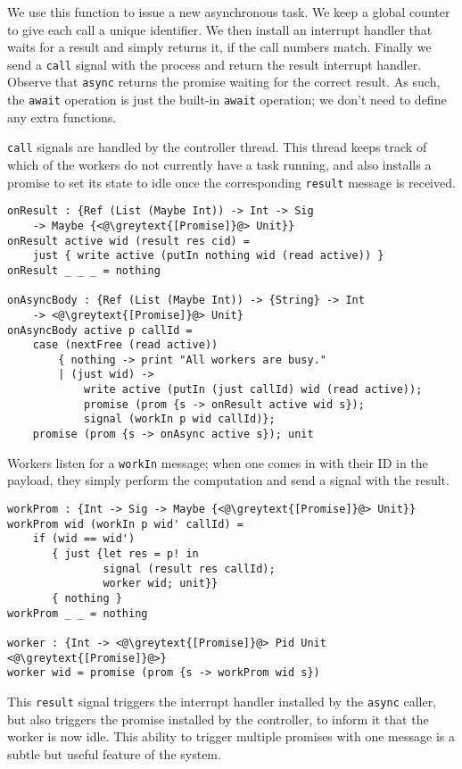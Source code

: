 \documentclass[msc,deptreport,cs]{infthesis} %
\newcommand{\code}[1]{\lstinline{#1}}
\newcommand{\greytext}[1]{\textcolor{black!40}{#1}}
\begin{document}
We use this function to issue a new asynchronous task. We keep a global counter
to give each call a unique identifier. We then install an interrupt handler that
waits for a result and simply returns it, if the call numbers match. Finally we
send a \code{call} signal with the process and return the result interrupt
handler. Observe that \code{async} returns the promise waiting for the correct
result. As such, the \code{await} operation is just the built-in \code{await}
operation; we don't need to define any extra functions.

\code{call} signals are handled by the controller thread. This thread keeps
track of which of the workers do not currently have a task running, and
also installs a promise to set its state to idle once the corresponding
\code{result} message is received.

\begin{lstlisting}
onResult : {Ref (List (Maybe Int)) -> Int -> Sig
    -> Maybe {<@\greytext{[Promise]}@> Unit}}
onResult active wid (result res cid) =
    just { write active (putIn nothing wid (read active)) }
onResult _ _ _ = nothing

onAsyncBody : {Ref (List (Maybe Int)) -> {String} -> Int
    -> <@\greytext{[Promise]}@> Unit}
onAsyncBody active p callId =
    case (nextFree (read active))
        { nothing -> print "All workers are busy."
        | (just wid) ->
            write active (putIn (just callId) wid (read active));
            promise (prom {s -> onResult active wid s});
            signal (workIn p wid callId)};
    promise (prom {s -> onAsync active s}); unit
\end{lstlisting}

Workers listen for a \code{workIn} message; when one comes in with their ID in
the payload, they simply perform the computation and send a signal with the
result.

\begin{lstlisting}
workProm : {Int -> Sig -> Maybe {<@\greytext{[Promise]}@> Unit}}
workProm wid (workIn p wid' callId) =
    if (wid == wid')
       { just {let res = p! in
               signal (result res callId);
               worker wid; unit}}
       { nothing }
workProm _ _ = nothing

worker : {Int -> <@\greytext{[Promise]}@> Pid Unit <@\greytext{[Promise]}@>}
worker wid = promise (prom {s -> workProm wid s})
\end{lstlisting}

This \code{result} signal triggers the interrupt handler installed by the
\code{async} caller, but also triggers the promise installed by the controller,
to inform it that the worker is now idle. This ability to trigger multiple
promises with one message is a subtle but useful feature of the system.
\end{document}
